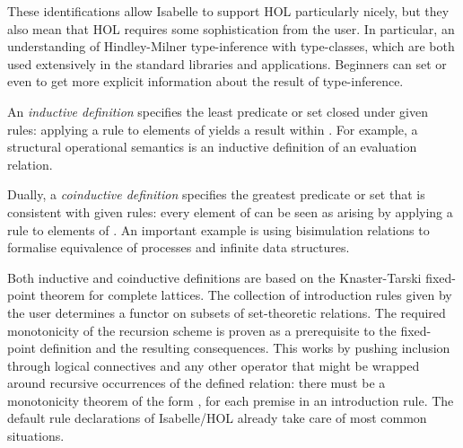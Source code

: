 \begin{isabellebody}
\begin{isamarkuptext}
  These identifications allow Isabelle to support HOL particularly
  nicely, but they also mean that HOL requires some sophistication
  from the user.  In particular, an understanding of Hindley-Milner
  type-inference with type-classes, which are both used extensively in
  the standard libraries and applications.  Beginners can set
  \hyperlink{attribute.show-types}{\mbox{}} or even \hyperlink{attribute.show-sorts}{\mbox{}} to get more
  explicit information about the result of type-inference.%
\end{isamarkuptext}%
\isamarkuptrue%
%
\isamarkuptrue%
%
\begin{isamarkuptext}%
An \emph{inductive definition} specifies the least predicate
  or set  closed under given rules: applying a rule to
  elements of  yields a result within .  For
  example, a structural operational semantics is an inductive
  definition of an evaluation relation.

  Dually, a \emph{coinductive definition} specifies the greatest
  predicate or set  that is consistent with given rules:
  every element of  can be seen as arising by applying a rule
  to elements of .  An important example is using
  bisimulation relations to formalise equivalence of processes and
  infinite data structures.
  
  Both inductive and coinductive definitions are based on the
  Knaster-Tarski fixed-point theorem for complete lattices.  The
  collection of introduction rules given by the user determines a
  functor on subsets of set-theoretic relations.  The required
  monotonicity of the recursion scheme is proven as a prerequisite to
  the fixed-point definition and the resulting consequences.  This
  works by pushing inclusion through logical connectives and any other
  operator that might be wrapped around recursive occurrences of the
  defined relation: there must be a monotonicity theorem of the form
  , for each premise  in an
  introduction rule.  The default rule declarations of Isabelle/HOL
  already take care of most common situations.


\end{isamarkuptext}
\end{isabellebody}
